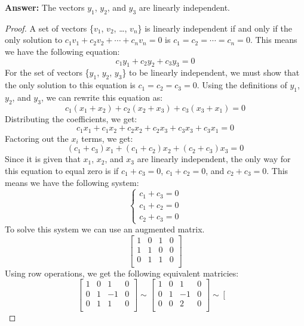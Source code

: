 \documentclass{article}
\begin{document}
\noindent
\textbf{Answer:} The vectors $y_{1}$, $y_{2}$, and $y_{3}$ are linearly independent.

\begin{proof}
A set of vectors \{$v_{1}$, $v_{2}$, \ldots, $v_{n}$\} is linearly independent if and only if
the only solution to $c_{1}v_{1} + c_{2}v_{2} + \cdots + c_{n}v_{n} = 0$ is $c_{1} = c_{2} = \cdots = c_{n} = 0$.
This means we have the following equation:
$$ c_{1}y_{1} + c_{2}y_{2} + c_{3}y_{3} = 0 $$
For the set of vectors \{$y_{1}$, $y_{2}$, $y_{3}$\} to be linearly independent, 
we must show that the only solution to this equation is $c_{1} = c_{2} = c_{3} = 0$.
Using the definitions of $y_{1}$, $y_{2}$, and $y_{3}$, we can rewrite this equation as:
$$ c_{1}(x_{1} + x_{2}) + c_{2}(x_{2} + x_{3}) + c_{3}(x_{3} + x_{1}) = 0 $$
Distributing the coefficients, we get:
$$ c_{1}x_{1} + c_{1}x_{2} + c_{2}x_{2} + c_{2}x_{3} + c_{3}x_{3} + c_{3}x_{1} = 0 $$
Factoring out the $x_{i}$ terms, we get:
$$ (c_{1} + c_{3})x_{1} + (c_{1} + c_{2})x_{2} + (c_{2} + c_{3})x_{3} = 0 $$
Since it is given that $x_{1}$, $x_{2}$, and $x_{3}$ are linearly independent,
the only way for this equation to equal zero is if $c_{1} + c_{3} = 0$, $c_{1} + c_{2} = 0$, and $c_{2} + c_{3} = 0$.
This means we have the following system:
$$ \begin{cases} c_{1} + c_{3} = 0 \\ c_{1} + c_{2} = 0 \\ c_{2} + c_{3} = 0 \end{cases} $$
To solve this system we can use an augmented matrix.
$$\left[\begin{array}{ccc|c}
1 & 0 & 1 & 0 \\ 1 & 1 & 0 & 0 \\ 0 & 1 & 1 & 0 \\ \end{array}\right]$$
Using row operations, we get the following equivalent matricies:
$$\left[\begin{array}{ccc|c}
1 & 0 & 1 & 0 \\ 0 & 1 & -1 & 0 \\ 0 & 1 & 1 & 0 \\ \end{array}\right] \sim
\left[\begin{array}{ccc|c}
1 & 0 & 1 & 0 \\ 0 & 1 & -1 & 0 \\ 0 & 0 & 2 & 0 \\ \end{array}\right] \sim
\left[\begin{array}{ccc|c}

\end{array}$$
\end{proof}
\end{document}

